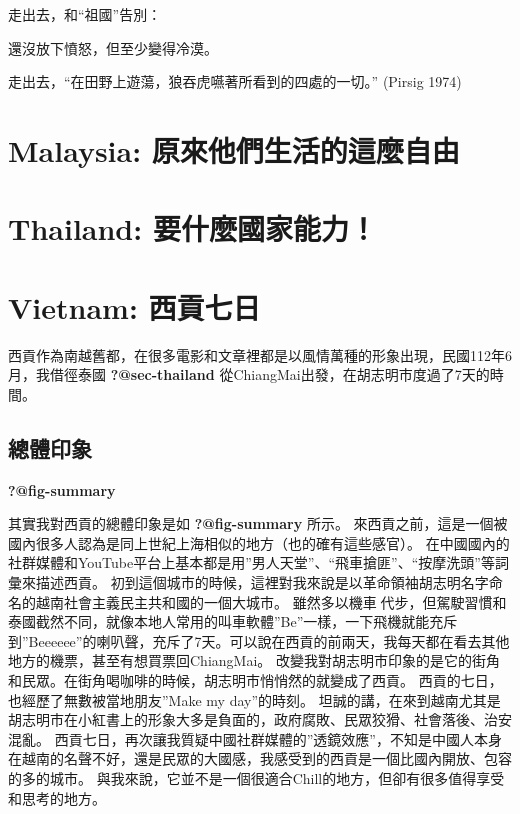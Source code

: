 \documentclass[
  a4paper,
]{ctexart}
\begin{document}
走出去，和``祖國''告別：

還沒放下憤怒，但至少變得冷漠。

走出去，``在田野上遊蕩，狼吞虎嚥著所看到的四處的一切。'' (Pirsig 1974)


\hypertarget{malaysia-ux539fux4f86ux4ed6ux5011ux751fux6d3bux7684ux9019ux9ebcux81eaux7531}{%
\chapter{Malaysia:
原來他們生活的這麼自由}\label{malaysia-ux539fux4f86ux4ed6ux5011ux751fux6d3bux7684ux9019ux9ebcux81eaux7531}}


\hypertarget{thailand-ux8981ux4ec0ux9ebcux570bux5bb6ux80fdux529b}{%
\chapter{Thailand:
要什麼國家能力！}\label{thailand-ux8981ux4ec0ux9ebcux570bux5bb6ux80fdux529b}}


\hypertarget{vietnam-ux897fux8ca2ux4e03ux65e5}{%
\chapter{Vietnam: 西貢七日}\label{vietnam-ux897fux8ca2ux4e03ux65e5}}

西貢作為南越舊都，在很多電影和文章裡都是以風情萬種的形象出現，民國112年6月，我借徑泰國
\textbf{?@sec-thailand} 從ChiangMai出發，在胡志明市度過了7天的時間。

\hypertarget{ux7e3dux9ad4ux5370ux8c61}{%
\section{總體印象}\label{ux7e3dux9ad4ux5370ux8c61}}

\textbf{?@fig-summary}

其實我對西貢的總體印象是如 \textbf{?@fig-summary} 所示。
來西貢之前，這是一個被國內很多人認為是同上世紀上海相似的地方（也的確有這些感官）。
在中國國內的社群媒體和YouTube平台上基本都是用''男人天堂''、``飛車搶匪''、``按摩洗頭''等詞彙來描述西貢。
初到這個城市的時候，這裡對我來說是以革命領袖胡志明名字命名的越南社會主義民主共和國的一個大城市。
雖然多以機車🛵代步，但駕駛習慣和泰國截然不同，就像本地人常用的叫車軟體''Be''一樣，一下飛機就能充斥到''Beeeeee''的喇叭聲，充斥了7天。可以說在西貢的前兩天，我每天都在看去其他地方的機票，甚至有想買票回ChiangMai。
改變我對胡志明市印象的是它的街角和民眾。在街角喝咖啡的時候，胡志明市悄悄然的就變成了西貢。
西貢的七日，也經歷了無數被當地朋友''Make my day''的時刻。
坦誠的講，在來到越南尤其是胡志明市在小紅書上的形象大多是負面的，政府腐敗、民眾狡猾、社會落後、治安混亂。
西貢七日，再次讓我質疑中國社群媒體的''透鏡效應''，不知是中國人本身在越南的名聲不好，還是民眾的大國感，我感受到的西貢是一個比國內開放、包容的多的城市。
與我來說，它並不是一個很適合Chill的地方，但卻有很多值得享受和思考的地方。
\end{document}
